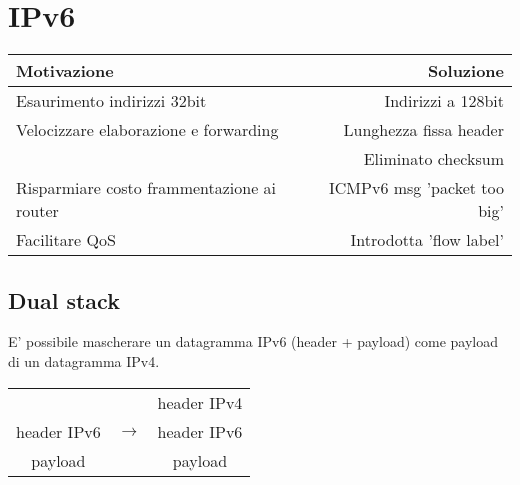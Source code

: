 \section{IPv6}
\begin{center}
    \begin{tabular}{||l | r||}
        \hline
        Motivazione & Soluzione\\
        \hline
        \hline
        Esaurimento indirizzi 32bit & Indirizzi a 128bit\\
        \hline
        Velocizzare elaborazione e forwarding & Lunghezza fissa header\\
        \space & Eliminato checksum\\
        \hline
        Risparmiare costo frammentazione ai router & ICMPv6 msg 'packet too big'\\
        \hline
        Facilitare QoS & Introdotta 'flow label'\\
        \hline
    \end{tabular}
\end{center}
\subsection{Dual stack}
E' possibile mascherare un datagramma IPv6 (header + payload) come payload di un datagramma IPv4.
\begin{center}
    \begin{tabular}{c c c}
        \space & \space & header IPv4\\
        header IPv6 & $\rightarrow$ & \small header IPv6\\
        payload & \space & \small payload\\
    \end{tabular}
\end{center}